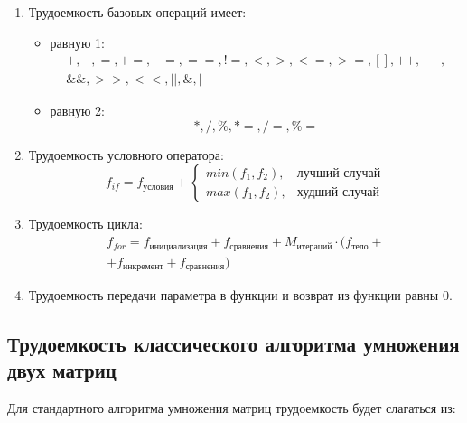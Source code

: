 \begin{enumerate}[label={\arabic*)}]
	\item Трудоемкость базовых операций имеет:
	\begin{itemize}[label=---]
		\item равную 1:
		\begin{equation}
			\label{for:operations_1}
			\begin{gathered}
				+, -, =, +=, -=, ==, !=, <, >, <=, >=, [], ++, {-}-,\\
				\&\&, >>, <<, ||, \&, |
			\end{gathered}
		\end{equation}
		\item равную 2:
		\begin{equation}
			\label{for:operations_2}
			*, /, \%, *=, /=, \%=
		\end{equation}
	\end{itemize}
	\item Трудоемкость условного оператора:
	\begin{equation}
		\label{for:if}
		f_{if} = f_{\text{условия}} + 
		\begin{cases}
			min(f_1, f_2), & \text{лучший случай}\\
			max(f_1, f_2), & \text{худший случай}
		\end{cases}
	\end{equation}
	\item Трудоемкость цикла:
	\begin{equation}
		\label{for:for}
		\begin{gathered}
			f_{for} = f_{\text{инициализация}} + f_{\text{сравнения}} + M_{\text{итераций}} \cdot (f_{\text{тело}} +\\
			+ f_{\text{инкремент}} + f_{\text{сравнения}})
		\end{gathered}
	\end{equation}
	\item Трудоемкость передачи параметра в функции и возврат из функции равны 0.
\end{enumerate}

\clearpage

\subsection{Трудоемкость классического алгоритма умножения двух матриц}

Для стандартного алгоритма умножения матриц трудоемкость будет слагаться из:

